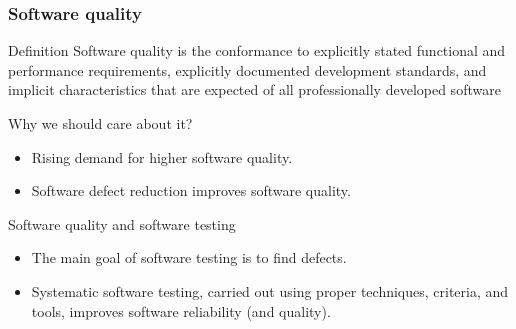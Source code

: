 \begin{frame}[parent={cmap:software-testing},hasnext=true,hasprev=true]
\frametitle{Software quality}
\label{concept:software-quality}

\begin{block:concept}{Definition}
Software quality is the conformance to explicitly stated functional and
performance requirements, explicitly documented development standards, and
implicit characteristics that are expected of all professionally developed
software~\cite{pressman:2005}
\end{block:concept}


\begin{block:fact}{Why we should care about it?}
\begin{itemize}
    \item Rising demand for higher software quality.

    \item Software defect reduction improves software quality.
\end{itemize}
\end{block:fact}

\begin{block:fact}{Software quality and software testing}
\begin{itemize}
	\item The main goal of software testing is to find defects.

	\item Systematic software testing, carried out using proper techniques,
	criteria, and tools, improves software reliability (and quality).
\end{itemize}
\end{block:fact}
\end{frame}